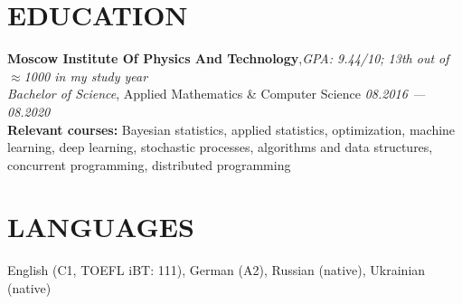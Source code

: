 \documentclass[11pt]{res}
\newcommand{\vmarginsmall}{\vspace{0.1cm}}
\begin{document}
\begin{resume}
\section{EDUCATION}
\vmarginsmall
\textbf{Moscow Institute Of Physics And Technology},\hfill \textit{GPA: 9.44/10; 13th out of $\approx$1000 in my study year}\\
{\sl Bachelor of Science}, Applied Mathematics \& Computer Science \hfill \textit{08.2016 — 08.2020} \\
\textbf{Relevant courses:} Bayesian statistics, applied statistics, optimization, machine learning, deep learning, stochastic processes, algorithms and data structures, concurrent programming, distributed programming
\section{LANGUAGES}
\vmarginsmall
English (C1, TOEFL iBT: 111), German (A2), Russian (native), Ukrainian (native)


\end{resume}
\end{document}
